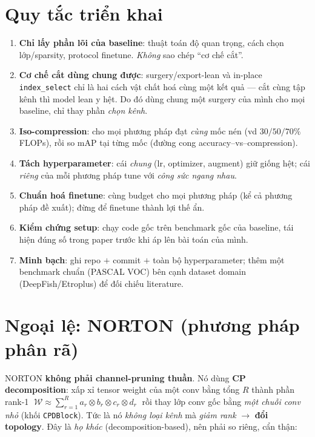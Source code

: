 \documentclass[11pt,a4paper]{article}
\begin{document}
\section{Quy tắc triển khai}
\begin{enumerate}
  \item \textbf{Chỉ lấy phần lõi của baseline}: thuật toán độ quan trọng, cách chọn lớp/sparsity,
        protocol finetune. \emph{Không} sao chép ``cơ chế cắt''.
  \item \textbf{Cơ chế cắt dùng chung được}: surgery/export-lean và in-place \texttt{index\_select}
        chỉ là hai cách vật chất hoá cùng một kết quả --- cắt cùng tập kênh thì model lean y hệt.
        Do đó dùng chung một surgery của mình cho mọi baseline, chỉ thay phần \emph{chọn kênh}.
  \item \textbf{Iso-compression}: cho mọi phương pháp đạt \emph{cùng} mốc nén (vd $30/50/70\%$ FLOPs),
        rồi so mAP tại từng mốc (đường cong accuracy--vs--compression).
  \item \textbf{Tách hyperparameter}: cái \emph{chung} (lr, optimizer, augment) giữ giống hệt;
        cái \emph{riêng} của mỗi phương pháp tune với \emph{công sức ngang nhau}.
  \item \textbf{Chuẩn hoá finetune}: cùng budget cho mọi phương pháp (kể cả phương pháp đề xuất);
        đừng để finetune thành lợi thế ẩn.
  \item \textbf{Kiểm chứng setup}: chạy code gốc trên benchmark gốc của baseline, tái hiện đúng số
        trong paper trước khi áp lên bài toán của mình.
  \item \textbf{Minh bạch}: ghi repo $+$ commit $+$ toàn bộ hyperparameter; thêm một benchmark chuẩn
        (PASCAL VOC) bên cạnh dataset domain (DeepFish/Etroplus) để đối chiếu literature.
\end{enumerate}

\section{Ngoại lệ: NORTON (phương pháp phân rã)}
NORTON \textbf{không phải channel-pruning thuần}. Nó dùng \textbf{CP decomposition}: xấp xỉ tensor
weight của một conv bằng tổng $R$ thành phần rank-1
$\;\mathcal{W}\approx\sum_{r=1}^{R} a_r\otimes b_r\otimes c_r\otimes d_r\;$
rồi thay lớp conv gốc bằng \emph{một chuỗi conv nhỏ} (khối \texttt{CPDBlock}). Tức là nó \emph{không loại
kênh} mà \emph{giảm rank} $\rightarrow$ \textbf{đổi topology}. Đây là \emph{họ khác}
(decomposition-based), nên phải so riêng, cẩn thận:
\end{document}
